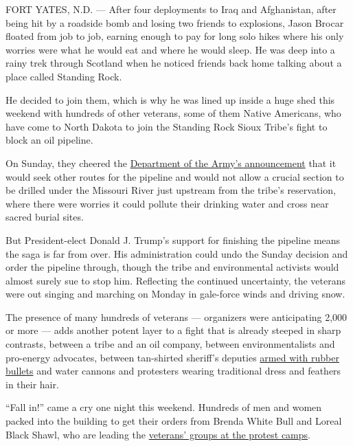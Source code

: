 FORT YATES, N.D. --- After four deployments to Iraq and Afghanistan,
after being hit by a roadside bomb and losing two friends to explosions,
Jason Brocar floated from job to job, earning enough to pay for long
solo hikes where his only worries were what he would eat and where he
would sleep. He was deep into a rainy trek through Scotland when he
noticed friends back home talking about a place called Standing Rock.

He decided to join them, which is why he was lined up inside a huge shed
this weekend with hundreds of other veterans, some of them Native
Americans, who have come to North Dakota to join the Standing Rock Sioux
Tribe's fight to block an oil pipeline.

On Sunday, they cheered the
\href{https://www.nytimes.com/2016/12/04/us/federal-officials-to-explore-different-route-for-dakota-pipeline.html}{Department
of the Army's announcement} that it would seek other routes for the
pipeline and would not allow a crucial section to be drilled under the
Missouri River just upstream from the tribe's reservation, where there
were worries it could pollute their drinking water and cross near sacred
burial sites.

But President-elect Donald J. Trump's support for finishing the pipeline
means the saga is far from over. His administration could undo the
Sunday decision and order the pipeline through, though the tribe and
environmental activists would almost surely sue to stop him. Reflecting
the continued uncertainty, the veterans were out singing and marching on
Monday in gale-force winds and driving snow.

The presence of many hundreds of veterans --- organizers were
anticipating 2,000 or more --- adds another potent layer to a fight that
is already steeped in sharp contrasts, between a tribe and an oil
company, between environmentalists and pro-energy advocates, between
tan-shirted sheriff's deputies
\href{http://www.nytimes.com/2016/11/21/us/dakota-access-pipeline-protesters-police.html}{armed
with rubber bullets} and water cannons and protesters wearing
traditional dress and feathers in their hair.

``Fall in!'' came a cry one night this weekend. Hundreds of men and
women packed into the building to get their orders from Brenda White
Bull and Loreal Black Shawl, who are leading the
\href{http://www.nytimes.com/2016/11/29/us/veterans-to-serve-as-human-shields-for-pipeline-protesters.html}{veterans'
groups at the protest camps}.

